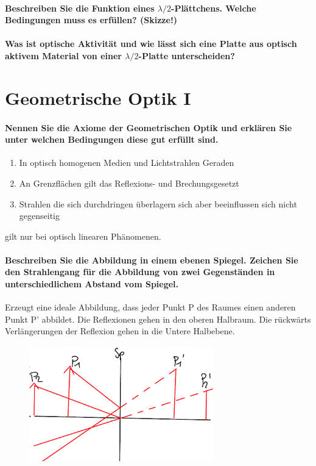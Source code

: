 \documentclass[a4paper, 11pt, parskip=half]{scrartcl}
\begin{document}
\paragraph{Beschreiben Sie die Funktion eines $\lambda/2$-Plättchens. Welche Bedingungen muss es
erfüllen? (Skizze!)}

\paragraph{Was ist optische Aktivität und wie lässt sich eine Platte aus optisch aktivem Material
von einer $\lambda/2$-Platte unterscheiden?}

\newpage

\section{Geometrische Optik I}


\paragraph{Nennen Sie die Axiome der Geometrischen Optik und erklären Sie unter welchen Bedingungen
diese gut erfüllt sind.}

\begin{enumerate}
\item In optisch homogenen Medien und Lichtstrahlen Geraden
\item An Grenzflächen gilt das Reflexions- und Brechungsgesetzt
\item Strahlen die sich durchdringen überlagern sich aber beeinflussen sich nicht gegenseitig
\end{enumerate}
 
gilt nur bei optisch linearen Phänomenen.

\paragraph{Beschreiben Sie die Abbildung in einem ebenen Spiegel. Zeichen Sie den Strahlengang für
die Abbildung von zwei Gegenständen in unterschiedlichem Abstand vom Spiegel.}

Erzeugt eine ideale Abbildung, dass jeder Punkt P des Raumes einen anderen Punkt P' abbildet. Die Reflexionen gehen in den oberen Halbraum.  Die rückwärts Verlängerungen der Reflexion gehen in die Untere Halbebene.

\begin{figure}[H]
    \centering
    \includegraphics[width=8cm]{image/17/geo12}
\end{figure}
\end{document}

